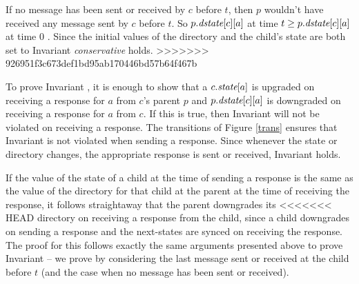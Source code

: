 If no message has been sent or received by $c$ before $t$, then $p$ wouldn't
have received any message sent by $c$ before $t$. So $p.\textit{dstate}[c][a]$ at time
$t \ge p.\textit{dstate}[c][a]$ at time $0$ . Since the initial values of the directory
and the child's state are both set to \In{} Invariant \textit{conservative}
holds.
>>>>>>> 926951f3c673def1bd95ab170446bd57b64f467b

To prove Invariant , it is enough to show that a
$c.\textit{state}[a]$ is upgraded on receiving a response for $a$ from $c$'s parent $p$
and $p.\textit{dstate}[c][a]$ is downgraded on receiving a response for $a$ from $c$.
If this is true, then Invariant  will not be
violated on receiving a response. The transitions of Figure \ref{trans} ensures
that Invariant  is not violated when sending a
response. Since whenever the state or directory changes, the appropriate
response is sent or received, Invariant  holds.

If the value of the state of a child at the time of sending a response is the
same as the value of the directory for that child at the parent at the time of
receiving the response, it follows straightaway that the parent downgrades its
<<<<<<< HEAD
directory on receiving a response from the child, since a child downgrades on
sending a response and the next-states are synced on receiving the response.
The proof for this follows exactly the same arguments presented above to prove
Invariant  -- we prove by considering the last message
sent or received at the child before $t$ (and the case when no message has been
sent or received).

